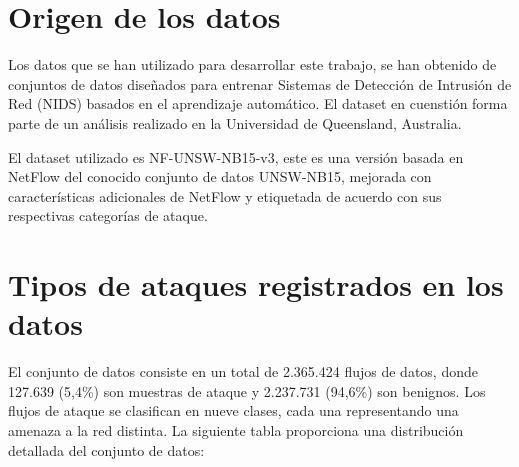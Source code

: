 \section{Origen de los datos}
Los datos que se han utilizado para desarrollar este trabajo, se han obtenido de  conjuntos de datos diseñados para entrenar Sistemas de Detección de Intrusión de Red (NIDS) basados en el aprendizaje automático. El dataset en cuenstión  forma parte de un análisis realizado en la Universidad de Queensland, Australia.\cite{}


El dataset utilizado es NF-UNSW-NB15-v3, este es una versión basada en NetFlow del conocido conjunto de datos UNSW-NB15, mejorada con características adicionales de NetFlow y etiquetada de acuerdo con sus respectivas categorías de ataque. 

\section{Tipos de ataques registrados en los datos}

El conjunto de datos consiste en un total de 2.365.424 flujos de datos, donde 127.639 (5,4\%) son muestras de ataque y 2.237.731 (94,6\%) son benignos. Los flujos de ataque se clasifican en nueve clases, cada una representando una amenaza a la red distinta. La siguiente tabla proporciona una distribución detallada del conjunto de datos:

